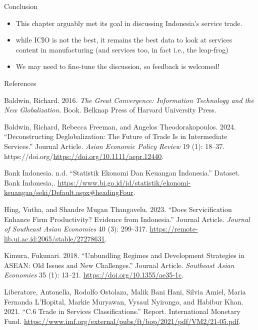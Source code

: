 \documentclass[
  ignorenonframetext,
]{beamer}
\newlength{\cslhangindent}
\newenvironment{CSLReferences}[2] %
 {\begin{list}{}{%
  \setlength{\itemindent}{0pt}
  \setlength{\leftmargin}{0pt}
  \setlength{\parsep}{0pt}
  \ifodd #1
   \setlength{\leftmargin}{\cslhangindent}
   \setlength{\itemindent}{-1\cslhangindent}
  \fi
  \setlength{\itemsep}{#2\baselineskip}}}
 {\end{list}}
\begin{document}
\begin{frame}{Conclusion}
\label{conclusion}
\begin{itemize}
\item
  This chapter arguably met its goal in discussing Indonesia's service
  trade.
\item
  while ICIO is not the best, it remains the best data to look at
  services content in manufacturing (and services too, in fact i.e., the
  leap-frog)
\item
  We may need to fine-tune the discussion, so feedback is welcomed!
\end{itemize}
\end{frame}

\begin{frame}[s]{References}
\label{references}
\label{refs}
\begin{CSLReferences}{1}{0}
Baldwin, Richard. 2016. \emph{The Great Convergence: Information
Technology and the New Globalization}. Book. Belknap Press of Harvard
University Press.

Baldwin, Richard, Rebecca Freeman, and Angelos Theodorakopoulos. 2024.
{``Deconstructing Deglobalization: The Future of Trade Is in
Intermediate Services.''} Journal Article. \emph{Asian Economic Policy
Review} 19 (1): 18--37.
https://doi.org/\url{https://doi.org/10.1111/aepr.12440}.

Bank Indonesia. n.d. {``Statistik Ekonomi Dan Keuangan Indonesia.''}
Dataset. Bank Indonesia,.
\url{https://www.bi.go.id/id/statistik/ekonomi-keuangan/seki/Default.aspx\#headingFour}.

Hing, Vutha, and Shandre Mugan Thangavelu. 2023. {``Does Servicification
Enhance Firm Productivity? Evidence from Indonesia.''} Journal Article.
\emph{Journal of Southeast Asian Economies} 40 (3): 299--317.
\url{https://remote-lib.ui.ac.id:2065/stable/27278631}.

Kimura, Fukunari. 2018. {``Unbundling Regimes and Development Strategies
in ASEAN: Old Issues and New Challenges.''} Journal Article.
\emph{Southeast Asian Economies} 35 (1): 13--21.
\url{https://doi.org/10.1355/ae35-1c}.

Liberatore, Antonella, Rodolfo Ostolaza, Malik Bani Hani, Silvia Amiel,
Maria Fernanda L'Hopital, Markie Muryawan, Vysaul Nyirongo, and Habibur
Khan. 2021. {``C.6 Trade in Services Classifications.''} Report.
International Monetary Fund.
\url{https://www.imf.org/external/pubs/ft/bop/2021/pdf/VM2/21-05.pdf}.


\end{CSLReferences}
\end{frame}
\end{document}
